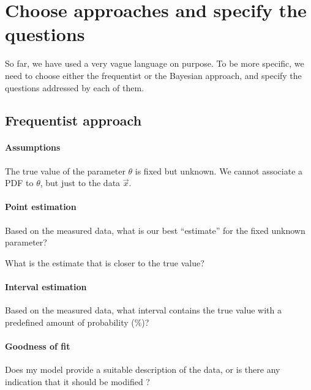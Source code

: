 

\section{Choose approaches and specify the questions}
\label{sec:measurement_approach}

So far, we have used a very vague language on purpose. To be more specific, we need to choose either the frequentist or the Bayesian approach, and specify the questions addressed by each of them.

\subsection{Frequentist approach}
\label{subsec:measurement_approach_frequentist}

\paragraph{Assumptions}

The true value of the parameter $\theta$ is fixed but unknown. We cannot associate a PDF to $\theta$, but just to the data $\vec{x}$.

\paragraph{Point estimation}

Based on the measured data, what is our best “estimate” for the fixed unknown parameter?

What is the estimate that is closer to the true value?

\paragraph{Interval estimation}


Based on the measured data, what interval contains the true value with a predefined amount of probability (\%)?

\paragraph{Goodness of fit}

Does my model provide a suitable description of the data, or is there any indication that it should be modified ?

